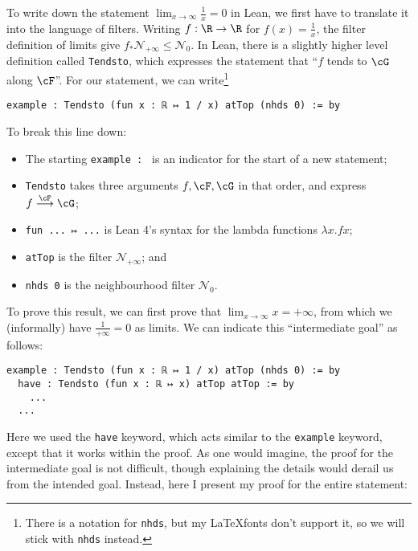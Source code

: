 To write down the statement \(\lim_{x \to \infty} \frac{1}{x} = 0\) in Lean, we first have to translate it into the language of filters. Writing \(f : \R \to \R\) for \(f(x) = \frac{1}{x}\), the filter definition of limits give \(f_*\mathcal{N}_{+\infty} \leq \mathcal{N}_0\). In Lean, there is a slightly higher level definition called \texttt{Tendsto}, which expresses the statement that ``\(f\) tends to \(\cG\) along \(\cF\)''. For our statement, we can write\footnote{There is a notation for \texttt{nhds}, but my \LaTeX fonts don't support it, so we will stick with \texttt{nhds} instead.}

\begin{verbatim}
example : Tendsto (fun x : ℝ ↦ 1 / x) atTop (nhds 0) := by
\end{verbatim}

To break this line down:

\begin{itemize}
  \item The starting \texttt{example : } is an indicator for the start of a new statement;
  \item \texttt{Tendsto} takes three arguments \(f, \cF, \cG\) in that order, and express \(f \stackrel{\cF}{\longrightarrow} \cG\);
  \item \texttt{fun ... ↦ ...} is Lean 4's syntax for the lambda functions \(\lambda x. f x\);
  \item \texttt{atTop} is the filter \(\mathcal{N}_{+\infty}\); and
  \item \texttt{nhds 0} is the neighbourhood filter \(\mathcal{N}_0\).
\end{itemize}

To prove this result, we can first prove that \(\lim_{x \to \infty} x = +\infty\), from which we (informally) have \(\frac{1}{+\infty} = 0\) as limits. We can indicate this ``intermediate goal'' as follows:

\begin{verbatim}
example : Tendsto (fun x : ℝ ↦ 1 / x) atTop (nhds 0) := by
  have : Tendsto (fun x : ℝ ↦ x) atTop atTop := by
    ...
  ...
\end{verbatim}

Here we used the \texttt{have} keyword, which acts similar to the \texttt{example} keyword, except that it works within the proof. As one would imagine, the proof for the intermediate goal is not difficult, though explaining the details would derail us from the intended goal. Instead, here I present my proof for the entire statement:

